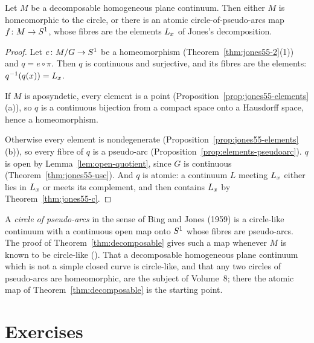 
\begin{theorem}\label{thm:decomposable}
Let $M$ be a decomposable homogeneous plane continuum. Then either $M$ is homeomorphic to the circle, or there is an atomic circle-of-pseudo-arcs map
$f\colon M\to S^1$, whose fibres are the elements $L_{x}$ of Jones's decomposition.
\end{theorem}

\begin{proof}
Let $e\colon M/G\to S^1$ be a homeomorphism (Theorem~\ref{thm:jones55-2}(1)) and $q=e\circ\pi$. Then $q$ is continuous and surjective, and its fibres are the elements:
$q^{-1}(q(x))=L_{x}$.

If $M$ is aposyndetic, every element is a point (Proposition~\ref{prop:jones55-elements}(a)), so $q$ is a continuous bijection from a compact space onto a Hausdorff space, hence
a homeomorphism.

Otherwise every element is nondegenerate (Proposition~\ref{prop:jones55-elements}(b)), so every fibre of $q$ is a pseudo-arc (Proposition~\ref{prop:elements-pseudoarc}). $q$ is open
by Lemma~\ref{lem:open-quotient}, since $G$ is continuous (Theorem~\ref{thm:jones55-usc}). And $q$ is atomic: a continuum $L$ meeting $L_{x}$ either lies in $L_{x}$ or meets its
complement, and then contains $L_{x}$ by Theorem~\ref{thm:jones55-c}.
\end{proof}


\begin{remark}\label{rem:circle-like}
A \emph{circle of pseudo-arcs} in the sense of Bing and Jones (1959) is a circle-like continuum with a continuous open map onto $S^1$ whose fibres are pseudo-arcs. The proof
of Theorem~\ref{thm:decomposable} gives such a map whenever $M$ is known to be circle-like (). That a decomposable homogeneous plane continuum which is not a simple
closed curve is circle-like, and that any two circles of pseudo-arcs are homeomorphic, are the subject of Volume~8; there the atomic map of Theorem~\ref{thm:decomposable} is the
starting point.
\end{remark}


\section*{Exercises}


